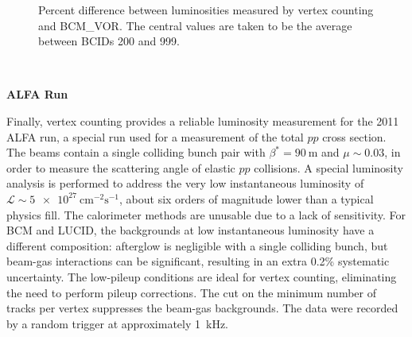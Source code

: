 \begin{figure}[h]
	\centering
	\caption{Percent difference between luminosities measured by vertex counting and BCM\_VOR. The central values are taken to be the average between BCIDs 200 and 999.}
	\label{fig:reco-luminosity-vertexing-muscan}
\end{figure}

\ 

\textbf{ALFA Run}

Finally, vertex counting provides a reliable luminosity measurement for the 2011 ALFA run, a special run used for a measurement of the total $pp$ cross section. The beams contain a single colliding bunch pair with $\beta^{*}=\SI{90}{\meter}$ and $\mu\sim0.03$, in order to measure the scattering angle of elastic $pp$ collisions. A special luminosity analysis is performed to address the very low instantaneous luminosity of $\mathcal{L}\sim\SI[per-mode=symbol]{5e27}{\centi\meter\tothe{-2}\second\tothe{-1}}$, about six orders of magnitude lower than a typical physics fill. The calorimeter methods are unusable due to a lack of sensitivity. For BCM and LUCID, the backgrounds at low instantaneous luminosity have a different composition: afterglow is negligible with a single colliding bunch, but beam-gas interactions can be significant, resulting in an extra 0.2\% systematic uncertainty. The low-pileup conditions are ideal for vertex counting, eliminating the need to perform pileup corrections. The cut on the minimum number of tracks per vertex suppresses the beam-gas backgrounds. The data were recorded by a random trigger at approximately 1~kHz. 

